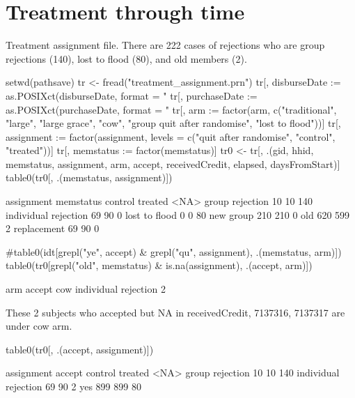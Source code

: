 \section{Treatment through time}


Treatment assignment file. There are 222 cases of rejections who are group rejections (140), lost to flood (80), and old members (2). 
\begin{Schunk}
\begin{Sinput}
setwd(pathsave)
tr <- fread("treatment_assignment.prn")
tr[, disburseDate := as.POSIXct(disburseDate, format = "%Y-%m-%d")]
tr[, purchaseDate := as.POSIXct(purchaseDate, format = "%Y-%m-%d")]
tr[, arm := factor(arm, c("traditional", "large", "large grace", "cow", 
	"group quit after randomise", "lost to flood"))]
tr[, assignment := factor(assignment, 
	levels = c("quit after randomise", "control", "treated"))]
tr[, memstatus := factor(memstatus)]
tr0 <- tr[, .(gid, hhid, memstatus, assignment, arm, accept,
	receivedCredit, elapsed, daysFromStart)]
table0(tr0[, .(memstatus, assignment)])
\end{Sinput}
\begin{Soutput}
                      assignment
memstatus              control treated <NA>
  group rejection           10      10  140
  individual rejection      69      90    0
  lost to flood              0       0   80
  new group                210     210    0
  old                      620     599    2
  replacement               69      90    0
\end{Soutput}
\begin{Sinput}
#table0(idt[grepl("ye", accept) & grepl("qu", assignment), .(memstatus, arm)])
table0(tr0[grepl("old", memstatus) & is.na(assignment), .(accept, arm)])
\end{Sinput}
\begin{Soutput}
                      arm
accept                 cow
  individual rejection   2
\end{Soutput}
\end{Schunk}
These 2 subjects who \textsf{accept}ed but NA in \textsf{receivedCredit}, 7137316, 7137317 are under cow arm. 
\begin{Schunk}
\begin{Sinput}
table0(tr0[, .(accept, assignment)])
\end{Sinput}
\begin{Soutput}
                      assignment
accept                 control treated <NA>
  group rejection           10      10  140
  individual rejection      69      90    2
  yes                      899     899   80
\end{Soutput}
\end{Schunk}
